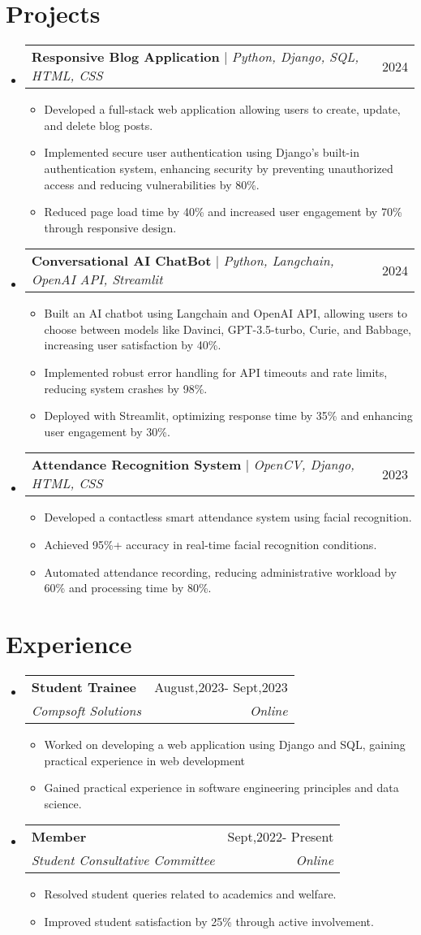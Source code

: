 \documentclass[letterpaper,11pt]{article}
\makeatletter
\newcommand{\resumeItem}[1]{
  \item\small{
    {#1 \vspace{-2pt}}
  }
}
\newcommand{\resumeSubheading}[4]{
  \vspace{-2pt}\item
    \begin{tabular*}{0.97\textwidth}[t]{l@{\extracolsep{\fill}}r}
      \textbf{#1} & #2 \\
      \textit{\small#3} & \textit{\small #4} \\
    \end{tabular*}\vspace{-7pt}
}
\newcommand{\resumeProjectHeading}[2]{
    \item
    \begin{tabular*}{0.97\textwidth}{l@{\extracolsep{\fill}}r}
      \small#1 & #2 \\
    \end{tabular*}\vspace{-7pt}
}
\newcommand{\resumeSubHeadingListStart}{\begin{itemize}[leftmargin=0.15in, label={}]}
\newcommand{\resumeSubHeadingListEnd}{\end{itemize}}
\newcommand{\resumeItemListStart}{\begin{itemize}}
\newcommand{\resumeItemListEnd}{\end{itemize}\vspace{-5pt}}
\makeatother
\begin{document}
\section{Projects}
\resumeSubHeadingListStart
  \resumeProjectHeading
    {\textbf{Responsive Blog Application} $|$ \textit{Python, Django, SQL, HTML, CSS}}{2024}
    \resumeItemListStart
      \resumeItem{Developed a full-stack web application allowing users to create, update, and delete blog posts.}
      \resumeItem{Implemented secure user authentication using Django's built-in authentication system, enhancing security by preventing unauthorized access and reducing vulnerabilities by 80\%.}
      \resumeItem{Reduced page load time by 40\% and increased user engagement by 70\% through responsive design.}
    \resumeItemListEnd
  \resumeProjectHeading
    {\textbf{Conversational AI ChatBot} $|$ \textit{Python, Langchain, OpenAI API, Streamlit}}{2024}
    \resumeItemListStart
      \resumeItem{Built an AI chatbot using Langchain and OpenAI API, allowing users to choose between models like Davinci, GPT-3.5-turbo, Curie, and Babbage, increasing user satisfaction by 40\%.}
      \resumeItem{Implemented robust error handling for API timeouts and rate limits, reducing system crashes by 98\%.}
      \resumeItem{Deployed with Streamlit, optimizing response time by 35\% and enhancing user engagement by 30\%.}
    \resumeItemListEnd
  \resumeProjectHeading
    {\textbf{Attendance Recognition System} $|$ \textit{OpenCV, Django, HTML, CSS}}{2023}
    \resumeItemListStart
      \resumeItem{Developed a contactless smart attendance system using facial recognition.}
      \resumeItem{Achieved 95\%+ accuracy in real-time facial recognition conditions.}
      \resumeItem{Automated attendance recording, reducing administrative workload by 60\% and processing time by 80\%.}
    \resumeItemListEnd
\resumeSubHeadingListEnd

\section{Experience}
\resumeSubHeadingListStart
  \resumeSubheading
    {Student Trainee}{August,2023- Sept,2023}
    {Compsoft Solutions}{Online}
    \resumeItemListStart
      \resumeItem{Worked on developing a web application using Django and SQL, gaining practical experience in web development}
      \resumeItem{Gained practical experience in software engineering principles and data science.}
    \resumeItemListEnd
  \resumeSubheading
    {Member}{ Sept,2022- Present}
    { Student Consultative Committee}{Online}
    \resumeItemListStart
      \resumeItem{Resolved student queries related to academics and welfare.}
      \resumeItem{Improved student satisfaction by 25\% through active involvement.}
    \resumeItemListEnd
\resumeSubHeadingListEnd
\end{document}
